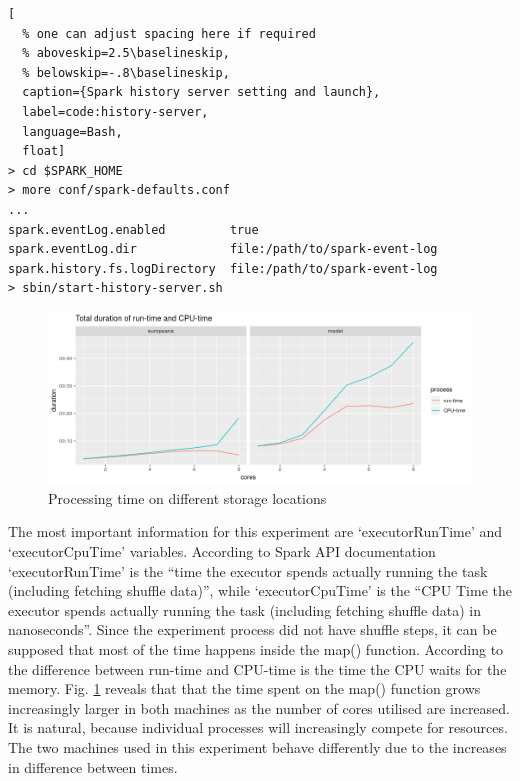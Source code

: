 \begin{lstlisting}[
  % one can adjust spacing here if required
  % aboveskip=2.5\baselineskip,
  % belowskip=-.8\baselineskip,
  caption={Spark history server setting and launch},
  label=code:history-server,
  language=Bash,
  float]
> cd $SPARK_HOME
> more conf/spark-defaults.conf
...
spark.eventLog.enabled         true
spark.eventLog.dir             file:/path/to/spark-event-log
spark.history.fs.logDirectory  file:/path/to/spark-event-log
> sbin/start-history-server.sh
\end{lstlisting}

\begin{figure}
\includegraphics[width=\textwidth]{images/chapter06/runtime-vs-cputime-absolute.png}
\caption{Processing time on different storage locations}
\label{figure:runtime-vs-cputime-absolute}
\end{figure}

The most important information for this experiment are `executorRunTime' and `executorCpuTime' variables. According to Spark API documentation \cite{spark-taskmetrics} `executorRunTime' is the ``time the executor spends actually running the task (including fetching shuffle data)'', while `executorCpuTime' is the ``CPU Time the executor spends actually running the task (including fetching shuffle data) in nanoseconds''. Since the experiment process did not have shuffle steps, it can be supposed that most of the time happens inside the map() function. According to \cite{canali2017} the difference between run-time and CPU-time is the time the CPU waits for the memory. Fig. \ref{figure:runtime-vs-cputime-absolute} reveals that that the time spent on the map() function grows increasingly larger in both machines as the number of cores utilised are increased. It is natural, because individual processes will increasingly compete for resources. The two machines used in this experiment behave differently due to the increases in difference between times.

